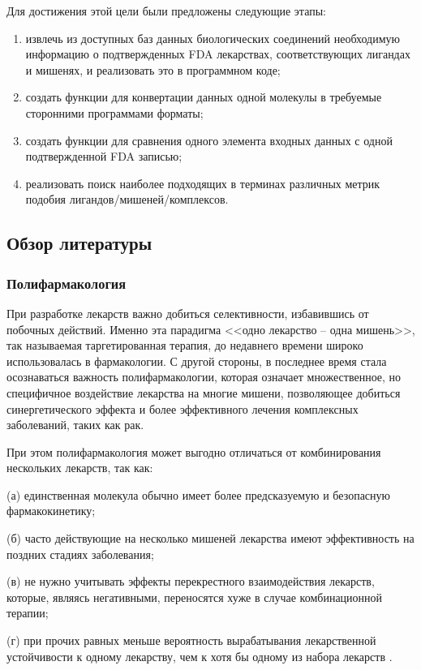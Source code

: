 \documentclass[a4paper,14pt]{article}         %
\begin{document}
Для достижения этой цели были предложены следующие этапы:
\begin{enumerate}
	\item извлечь из доступных баз данных биологических соединений необходимую информацию о подтвержденных FDA лекарствах, соответствующих лигандах и мишенях, и реализовать это в программном коде;
	\item создать функции для конвертации данных одной молекулы в требуемые сторонними программами форматы;
	\item создать функции для сравнения одного элемента входных данных с одной подтвержденной FDA записью;
	\item реализовать поиск наиболее подходящих в терминах различных метрик подобия лигандов/мишеней/комплексов.
\end{enumerate}

\subsection{Обзор литературы}
\subsubsection{Полифармакология}
При разработке лекарств важно добиться селективности, избавившись от побочных действий. Именно эта парадигма <<одно лекарство -- одна мишень>>, так называемая таргетированная терапия, до недавнего времени широко использовалась в фармакологии. С другой стороны, в последнее время стала осознаваться важность полифармакологии, которая означает множественное, но специфичное воздействие лекарства на многие мишени, позволяющее добиться синергетического эффекта и более эффективного лечения комплексных заболеваний, таких как рак\cite{Anighoro2014}. 

При этом полифармакология может выгодно отличаться от комбинирования нескольких лекарств, так как:

(а) единственная молекула обычно имеет более предсказуемую и безопасную фармакокинетику; 

(б) часто действующие на несколько мишеней лекарства имеют  эффективность на поздних стадиях заболевания; 

(в) не нужно учитывать эффекты перекрестного взаимодействия лекарств, которые, являясь негативными, переносятся хуже в случае комбинационной терапии; 

(г) при прочих равных меньше вероятность вырабатывания лекарственной устойчивости к одному лекарству, чем к хотя бы одному из набора лекарств \cite{Anighoro2014}.
\end{document}
